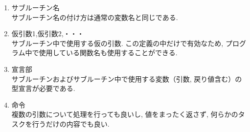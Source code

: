 \begin{enumerate}
\item サブルーチン名\\
サブルーチン名の付け方は通常の変数名と同じである. 
\item 仮引数1,仮引数2,・・・\\
サブルーチン中で使用する仮の引数. この定義の中だけで有効なため, 
プログラム中で使用している関数名も使用することができる. 
\item 宣言部\\
サブルーチンおよびサブルーチン中で使用する変数（引数, 戻り値含む）の型宣言が必要である. 
\item 命令\\
複数の引数について処理を行っても良いし, 値をまったく返さず, 何らかのタスクを行うだけの内容でも良い. \\
\end{enumerate}


\begin{comment}
\subsection*{$<$演習課題$>$}
フィボナッチ数列は大きい$k$に関して, 
$\log(a_k) \approx k\log\left(\frac{1+\sqrt{5}}{2}\right)$
と近似できることが知られている. 

$\log(k!)$ と同様に, 任意の$k$に関して, $\log(a_k)$の値を精度よく高効率に計算できる
機能をサブルーチンとして作成せよ. 
\end{comment}


